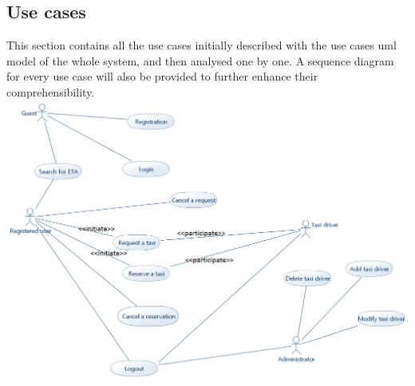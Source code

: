 \documentclass{article}
\begin{document}
\subsection{Use cases}
This section contains all the use cases initially described with the use cases uml model of the whole system, and then analysed one by one. A sequence diagram for every use case will also be provided to further enhance their comprehensibility.
\includegraphics[width=.9\textwidth,height=.9\textheight,keepaspectratio]{UseCaseDiagram}
\end{document}
